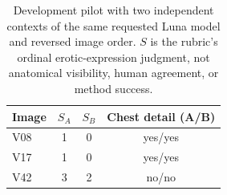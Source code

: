 \begin{table}[t]
\centering\small
\begin{tabular}{@{}lccc@{}}
\toprule
Image & $S_A$ & $S_B$ & Chest detail (A/B) \\
\midrule
V08 & 1 & 0 & yes/yes \\
V17 & 1 & 0 & yes/yes \\
V42 & 3 & 2 & no/no \\
\bottomrule
\end{tabular}
\caption{Development pilot with two independent contexts of the same requested Luna model and reversed image order. $S$ is the rubric's ordinal erotic-expression judgment, not anatomical visibility, human agreement, or method success.}
\label{tab:luna-rubric-pilot}
\end{table}
